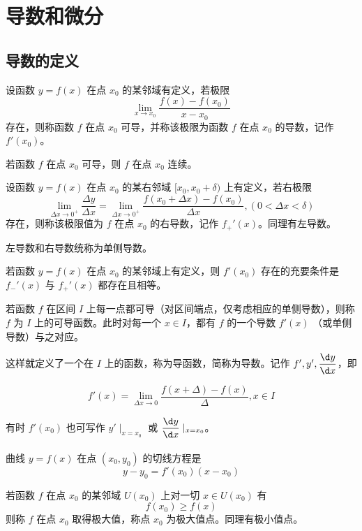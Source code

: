 
\chapter{导数和微分}

\section{导数的定义}

\begin{definition}
	设函数 $y=f(x)$ 在点 $x_0$ 的某邻域有定义，若极限
	$$\lim_{x\to x_0}\frac{f(x)-f(x_0)}{x-x_0}$$
	存在，则称函数 $f$ 在点 $x_0$ 可导，并称该极限为函数 $f$ 在点 $x_0$ 的导数，记作 $f'(x_0)$。
\end{definition}

\begin{theorem}
	若函数 $f$ 在点 $x_0$ 可导，则 $f$ 在点 $x_0$ 连续。
\end{theorem}

\begin{definition}
	设函数 $y=f(x)$ 在点 $x_0$ 的某右邻域 $[x_0,x_0+\delta)$ 上有定义，若右极限
	$$\lim_{\Delta x\to 0^+}\frac{\Delta y}{\Delta x} = \lim_{\Delta x\to 0^+}\frac{f(x_0+\Delta x)-f(x_0)}{\Delta x},(0<\Delta x<\delta)$$
	存在，则称该极限值为 $f$ 在点 $x_0$ 的右导数，记作 $f_+'(x)$。同理有左导数。
\end{definition}

左导数和右导数统称为单侧导数。

\begin{theorem}
	若函数 $y=f(x)$ 在点 $x_0$ 的某邻域上有定义，则 $f'(x_0)$ 存在的充要条件是 $f_-'(x)$ 与 $f_+'(x)$ 都存在且相等。
\end{theorem}

若函数 $f$ 在区间 $I$ 上每一点都可导（对区间端点，仅考虑相应的单侧导数），则称 $f$ 为 $I$ 上的可导函数。此时对每一个 $x\in I$，都有 $f$ 的一个导数 $f'(x)$ （或单侧导数）与之对应。

这样就定义了一个在 $I$ 上的函数，称为导函数，简称为导数。记作 $f',y',\dfrac{\d y}{\d x}$，即

$$f'(x) = \lim_{\Delta x \to 0}\frac{f(x+\Delta)-f(x)}{\Delta},x\in I$$

有时 $f'(x_0)$ 也可写作 $y'\mid_{x=x_0}$ 或 $\mfrac{\d y}{\d x}\mid_{x=x_0}$。

曲线 $y = f(x)$ 在点 $(x_0,y_0)$ 的切线方程是
$$y-y_0 = f'(x_0)(x-x_0)$$

\begin{definition}
	若函数 $f$ 在点 $x_0$ 的某邻域 $U(x_0)$ 上对一切 $x\in U(x_0)$ 有
	$$f(x_0) \geqslant f(x)$$
	则称 $f$ 在点 $x_0$ 取得极大值，称点 $x_0$ 为极大值点。同理有极小值点。
\end{definition}

